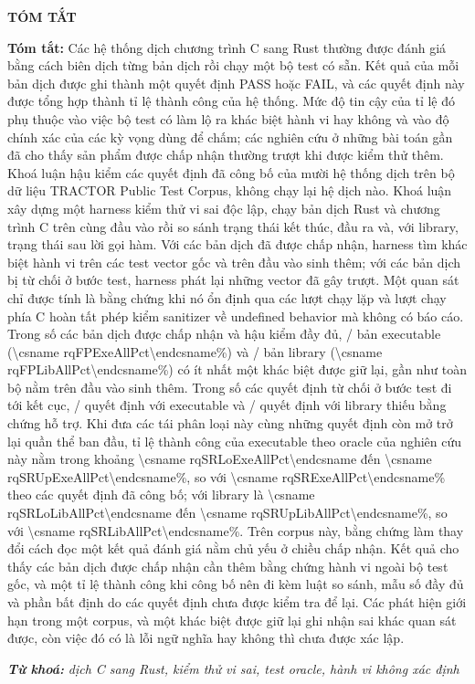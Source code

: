 \providecommand{\vipct}[1]{\begingroup\edef\vitmp{\endgroup\noexpand\num[output-decimal-marker={,}]{\csname #1\endcsname}}\vitmp}
\thispagestyle{plain}
\begin{center}
{\fontsize{13}{16}\selectfont\bfseries TÓM TẮT}
\end{center}
\vspace{1em}

\begingroup
\fontsize{12}{15}\selectfont
\noindent\textbf{Tóm tắt:}
Các hệ thống dịch chương trình C sang Rust thường được đánh giá bằng cách biên dịch từng bản dịch rồi chạy một bộ test có sẵn. Kết quả của mỗi bản dịch được ghi thành một quyết định PASS hoặc FAIL, và các quyết định này được tổng hợp thành tỉ lệ thành công của hệ thống. Mức độ tin cậy của tỉ lệ đó phụ thuộc vào việc bộ test có làm lộ ra khác biệt hành vi hay không và vào độ chính xác của các kỳ vọng dùng để chấm; các nghiên cứu ở những bài toán gần đã cho thấy sản phẩm được chấp nhận thường trượt khi được kiểm thử thêm. Khoá luận hậu kiểm các quyết định đã công bố của mười hệ thống dịch trên bộ dữ liệu TRACTOR Public Test Corpus, không chạy lại hệ dịch nào. Khoá luận xây dựng một harness kiểm thử vi sai độc lập, chạy bản dịch Rust và chương trình C trên cùng đầu vào rồi so sánh trạng thái kết thúc, đầu ra và, với library, trạng thái sau lời gọi hàm. Với các bản dịch đã được chấp nhận, harness tìm khác biệt hành vi trên các test vector gốc và trên đầu vào sinh thêm; với các bản dịch bị từ chối ở bước test, harness phát lại những vector đã gây trượt. Một quan sát chỉ được tính là bằng chứng khi nó ổn định qua các lượt chạy lặp và lượt chạy phía C hoàn tất phép kiểm sanitizer về undefined behavior mà không có báo cáo. Trong số các bản dịch được chấp nhận và hậu kiểm đầy đủ, \rqFPExeAllNum/\rqFPExeAllDen{} bản executable (\vipct{rqFPExeAllPct}\%) và \rqFPLibAllNum/\rqFPLibAllDen{} bản library (\vipct{rqFPLibAllPct}\%) có ít nhất một khác biệt được giữ lại, gần như toàn bộ nằm trên đầu vào sinh thêm. Trong số các quyết định từ chối ở bước test đi tới kết cục, \rqFFExeAllNum/\rqFFExeAllDen{} quyết định với executable và \rqFFLibAllNum/\rqFFLibAllDen{} quyết định với library thiếu bằng chứng hỗ trợ. Khi đưa các tái phân loại này cùng những quyết định còn mở trở lại quần thể ban đầu, tỉ lệ thành công của executable theo oracle của nghiên cứu này nằm trong khoảng \vipct{rqSRLoExeAllPct} đến \vipct{rqSRUpExeAllPct}\%, so với \vipct{rqSRExeAllPct}\% theo các quyết định đã công bố; với library là \vipct{rqSRLoLibAllPct} đến \vipct{rqSRUpLibAllPct}\%, so với \vipct{rqSRLibAllPct}\%. Trên corpus này, bằng chứng làm thay đổi cách đọc một kết quả đánh giá nằm chủ yếu ở chiều chấp nhận. Kết quả cho thấy các bản dịch được chấp nhận cần thêm bằng chứng hành vi ngoài bộ test gốc, và một tỉ lệ thành công khi công bố nên đi kèm luật so sánh, mẫu số đầy đủ và phần bất định do các quyết định chưa được kiểm tra để lại. Các phát hiện giới hạn trong một corpus, và một khác biệt được giữ lại ghi nhận sai khác quan sát được, còn việc đó có là lỗi ngữ nghĩa hay không thì chưa được xác lập.

\vspace{1em}
\noindent\textit{\textbf{Từ khoá:}} \textit{dịch C sang Rust, kiểm thử vi sai, test oracle, hành vi không xác định}
\endgroup
\clearpage
